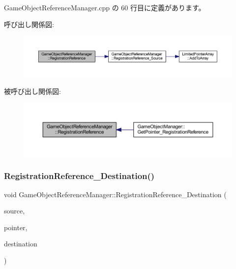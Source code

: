  Game\+Object\+Reference\+Manager.\+cpp の 60 行目に定義があります。

呼び出し関係図\+:\nopagebreak
\begin{figure}[H]
\begin{center}
\leavevmode
\includegraphics[width=350pt]{class_game_object_reference_manager_a4195eafdda534044454b6d48efc7d03d_cgraph}
\end{center}
\end{figure}
被呼び出し関係図\+:\nopagebreak
\begin{figure}[H]
\begin{center}
\leavevmode
\includegraphics[width=350pt]{class_game_object_reference_manager_a4195eafdda534044454b6d48efc7d03d_icgraph}
\end{center}
\end{figure}
\mbox{\label{class_game_object_reference_manager_a8aaa23d4a8644a100b7154c92b845f78}} 
\subsubsection{\texorpdfstring{Registration\+Reference\+\_\+\+Destination()}{RegistrationReference\_Destination()}}
{\footnotesize\ttfamily void Game\+Object\+Reference\+Manager\+::\+Registration\+Reference\+\_\+\+Destination (\begin{DoxyParamCaption}\item[{\mbox{\hyperlink{class_game_object_base}{Game\+Object\+Base}} $\ast$}]{source,  }\item[{void $\ast$}]{pointer,  }\item[{\mbox{\hyperlink{class_game_object_base}{Game\+Object\+Base}} $\ast$}]{destination }\end{DoxyParamCaption})\hspace{0.3cm}{\ttfamily [private]}}



